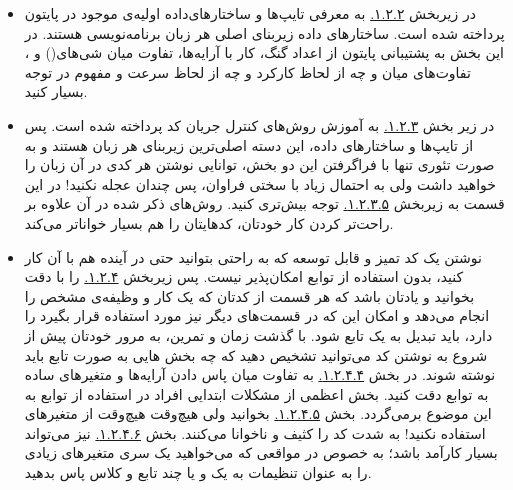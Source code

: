 \documentclass[11pt, a4paper]{article}
\begin{document}
\begin{itemize}[label=\Large $\bullet$]
	\item 
  در زیربخش 
  \href{https://scipy-lectures.org/intro/language/basic_types.html}{۱.۲.۲.}
  به معرفی تایپ‌ها و ساختارهای‌داده‌ اولیه‌ی موجود در پایتون پرداخته شده است.
  ساختارهای داده زیربنای اصلی هر زبان برنامه‌نویسی هستند.
  در این بخش به پشتیبانی پایتون از اعداد گنگ،
  کار با آرایه‌ها،
  تفاوت میان 
  شی‌های()
  و
  ،
  تفاوت‌های میان
  و
  چه از لحاظ کارکرد و چه از لحاظ سرعت و مفهوم
  در
  توجه بسیار کنید.

  \item 
  در زیر بخش
  \href{https://scipy-lectures.org/intro/language/control_flow.html}{۱.۲.۳.}
  به آموزش روش‌های کنترل جریان کد پرداخته شده است.
  پس از تایپ‌ها و ساختارهای داده، این دسته اصلی‌ترین زیربنای هر زبان هستند
  و به صورت تئوری تنها با فراگرفتن این دو بخش،
  توانایی نوشتن هر کدی در آن زبان را خواهید داشت ولی به احتمال زیاد با سختی‌ فراوان،
  پس چندان عجله نکنید!
  در این قسمت به زیربخش
  \href{https://scipy-lectures.org/intro/language/control_flow.html#advanced-iteration}{۱.۲.۳.۵.}
  توجه بیش‌تری کنید.
  روش‌های ذکر شده در آن علاوه بر راحت‌تر کردن کار خودتان،
  کدهایتان را هم بسیار خواناتر می‌کند.

  \item
  نوشتن یک کد تمیز و قابل توسعه که به راحتی بتوانید حتی در آینده هم با آن کار کنید،
  بدون استفاده از توابع امکان‌پذیر نیست.
  پس زیربخش
  \href{https://scipy-lectures.org/intro/language/functions.html}{۱.۲.۴.}
  را با دقت بخوانید و یادتان باشد که هر قسمت از کدتان که یک کار و وظیفه‌ی مشخص را انجام می‌دهد
  و امکان این‌ که در قسمت‌های دیگر نیز مورد استفاده قرار بگیرد را دارد،
  باید تبدیل به یک تابع شود.
  با گذشت زمان و تمرین،
  به مرور خودتان پیش از شروع به نوشتن کد می‌توانید تشخیص دهید که چه بخش هایی به صورت تابع باید نوشته شوند.
  در بخش
  \href{https://scipy-lectures.org/intro/language/functions.html#passing-by-value}{۱.۲.۴.۴.}
  به تفاوت میان پاس دادن آرایه‌ها و متغیر‌های ساده به توابع دقت کنید.
  بخش اعظمی از مشکلات ابتدایی افراد در استفاده از توابع به این موضوع برمی‌گردد.
  بخش
  \href{https://scipy-lectures.org/intro/language/functions.html#global-variables}{۱.۲.۴.۵.}
  بخوانید ولی هیچ‌وقت هیچ‌وقت از متغیر‌های 
  استفاده نکنید!
  به شدت کد را کثیف و ناخوانا می‌کنند.
  بخش
  \href{https://scipy-lectures.org/intro/language/functions.html#variable-number-of-parameters}{۱.۲.۴.۶.}
  نیز می‌تواند بسیار کارآمد باشد؛ به خصوص در مواقعی که می‌خواهید یک سری متغیر‌های زیادی را به عنوان
  تنظیمات به یک و یا چند تابع و کلاس پاس بدهید.


\end{itemize}
\end{document}
